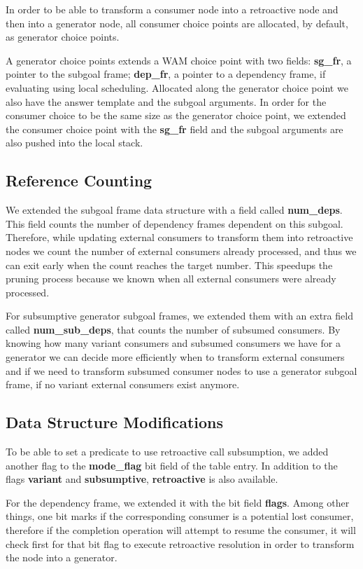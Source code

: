 In order to be able to transform a consumer node into a retroactive node and then into a generator node,
all consumer choice points are allocated, by default, as generator choice points.

A generator choice points extends a WAM choice point with two fields:
\textbf{sg\_fr}, a pointer to the subgoal frame; \textbf{dep\_fr}, a pointer to a dependency frame,
if evaluating using local scheduling. Allocated along the generator choice point we also have the answer
template and the subgoal arguments. In order for the consumer choice to be the same size as the
generator choice point, we extended the consumer choice point with the \textbf{sg\_fr} field and
the subgoal arguments are also pushed into the local stack.

\subsection{Reference Counting}

We extended the subgoal frame data structure with a field called \textbf{num\_deps}. This field
counts the number of dependency frames dependent on this subgoal. Therefore, while updating
external consumers to transform them into retroactive nodes we count the number of external consumers
already processed, and thus we can exit early when the count reaches the target number. This speedups
the pruning process because we known when all external consumers were already processed.

For subsumptive generator subgoal frames, we extended them with an extra field called \textbf{num\_sub\_deps}, that
counts the number of subsumed consumers. By knowing how many variant consumers and subsumed consumers we
have for a generator we can decide more efficiently when to transform external consumers and if we
need to transform subsumed consumer nodes to use a generator subgoal frame, if no variant external consumers
exist anymore.

\subsection{Data Structure Modifications}

To be able to set a predicate to use retroactive call subsumption, we added another flag to the
\textbf{mode\_flag} bit field of the table entry. In addition to the flags \textbf{variant} and 
\textbf{subsumptive}, \textbf{retroactive} is also available.

For the dependency frame, we extended it with the bit field \textbf{flags}. Among other things,
one bit marks if the corresponding consumer is a potential lost consumer, therefore if the completion
operation will attempt to resume the consumer, it will check first for that bit flag to execute
retroactive resolution in order to transform the node into a generator.

